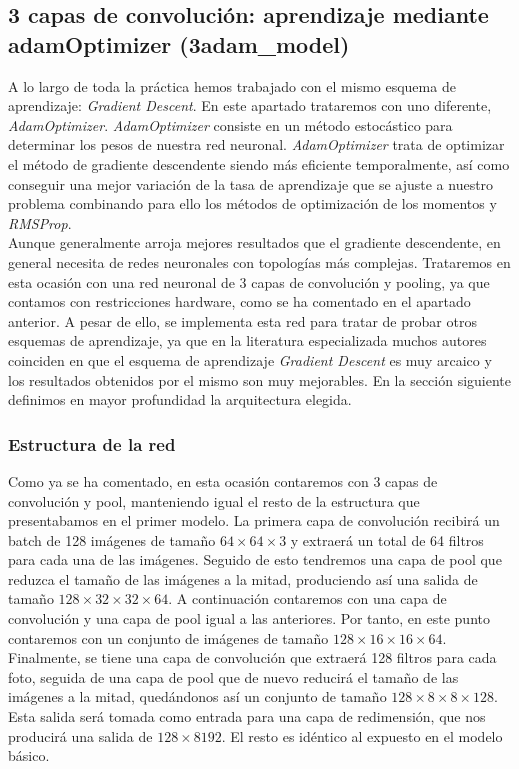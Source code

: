 \documentclass[11pt]{article}
\theoremstyle{plain}
\theoremstyle{definition}
\begin{document}
\subsection{3 capas de convolución: aprendizaje mediante adamOptimizer
  (3adam\_model)}

A lo largo de toda la práctica hemos trabajado con el mismo esquema de
aprendizaje: \textit{Gradient Descent}. En este apartado trataremos
con uno diferente, \textit{AdamOptimizer}. \textit{AdamOptimizer}
consiste en un método estocástico para determinar los pesos de nuestra
red neuronal. \textit{AdamOptimizer} trata de optimizar el método de
gradiente descendente siendo más eficiente temporalmente, así como 
conseguir una mejor variación de la tasa de aprendizaje que se ajuste
a nuestro problema combinando para ello los métodos de optimización
de los momentos y \textit{RMSProp}.\\



Aunque generalmente arroja mejores resultados que el gradiente
descendente, en general necesita de redes neuronales con topologías
más complejas.  Trataremos en esta ocasión con una red neuronal de 3
capas de convolución y pooling, ya que contamos con restricciones
hardware, como se ha comentado en el apartado anterior. A pesar de
ello, se implementa esta red para tratar de probar otros esquemas de
aprendizaje, ya que en la literatura especializada muchos autores
coinciden en que el esquema de aprendizaje \textit{Gradient Descent}
es muy arcaico y los resultados obtenidos por el mismo son muy
mejorables. En la sección siguiente definimos en mayor profundidad la
arquitectura elegida.

\subsubsection{Estructura de la red}

Como ya se ha comentado, en esta ocasión contaremos con 3 capas de
convolución y pool, manteniendo igual el resto de la estructura que
presentabamos en el primer modelo. La primera capa de convolución
recibirá un batch de 128 imágenes de tamaño $64 \times 64 \times 3$ y
extraerá un total de 64 filtros para cada una de las imágenes. Seguido
de esto tendremos una capa de pool que reduzca el tamaño de las
imágenes a la mitad, produciendo así una salida de tamaño
$128 \times 32 \times 32 \times 64$.  A continuación contaremos con
una capa de convolución y una capa de pool igual a las anteriores. Por
tanto, en este punto contaremos con un conjunto de imágenes de tamaño
$128 \times 16 \times 16 \times 64$. Finalmente, se tiene una capa de
convolución que extraerá 128 filtros para cada foto, seguida de una
capa de pool que de nuevo reducirá el tamaño de las imágenes a la
mitad, quedándonos así un conjunto de tamaño
$128 \times 8 \times 8 \times 128$. Esta salida será tomada como
entrada para una capa de redimensión, que nos producirá una salida de
$128 \times 8192$. El resto es idéntico al expuesto en el modelo
básico.\\
\end{document}
